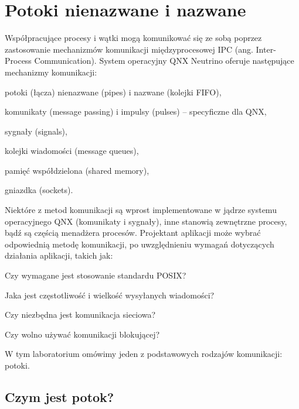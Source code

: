 \section{Potoki nienazwane i nazwane}
\label{sec:TQIXQ}

Współpracujące procesy i wątki mogą komunikować się ze sobą poprzez
zastosowanie mechanizmów komunikacji międzyprocesowej IPC (ang. Inter-Process
Communication). System operacyjny QNX Neutrino oferuje następujące mechanizmy
komunikacji:
\begin{myitemize}
  \item potoki (łącza) nienazwane (pipes) i nazwane (kolejki FIFO),
  \item komunikaty (message passing) i impulsy (pulses) – specyficzne dla QNX,
  \item sygnały (signals),
  \item kolejki wiadomości (message queues),
  \item pamięć współdzielona (shared memory),
  \item gniazdka (sockets).
\end{myitemize}

Niektóre z metod komunikacji są wprost implementowane w jądrze systemu
operacyjnego QNX (komunikaty i sygnały), inne stanowią zewnętrzne procesy, bądź
są częścią menadżera procesów. Projektant aplikacji może wybrać odpowiednią
metodę komunikacji, po uwzględnieniu wymagań dotyczących działania aplikacji,
takich jak:
\begin{myitemize}
  \item Czy wymagane jest stosowanie standardu POSIX?
  \item Jaka jest częstotliwość i wielkość wysyłanych wiadomości?
  \item Czy niezbędna jest komunikacja sieciowa?
  \item Czy wolno używać komunikacji blokującej?
\end{myitemize}

W tym laboratorium omówimy jeden z podstawowych rodzajów komunikacji: potoki.

\subsection{Czym jest potok?}
\label{sec:JT0OO}

